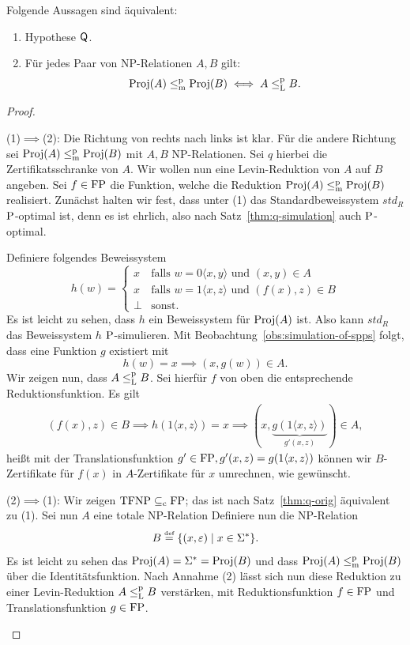 \begin{theorem}\label{thm:q-as-levin}
    Folgende Aussagen sind äquivalent:
    \begin{enumerate}
        \item Hypothese $\hQ$.
        \item Für jedes Paar von NP-Relationen $A, B$ gilt:
            \[ \Proj(A) \leqmp \Proj(B) \iff A \leqlp B. \]
    \end{enumerate}
\end{theorem}
\begin{proof}
    \begin{prooflist}
\item (1)$\implies$(2): Die Richtung von rechts nach links ist klar. Für die andere Richtung sei $\Proj(A) \leqmp \Proj(B)$ mit $A,B$ NP-Relationen. Sei $q$ hierbei die Zertifikatsschranke von $A$.
    Wir wollen nun eine Levin-Reduktion von $A$ auf $B$ angeben. Sei $f\in \FP$ die Funktion, welche die Reduktion $\Proj(A) \leqmp \Proj(B)$ realisiert.
    Zunächst halten wir fest, dass unter (1) das Standardbeweissystem $\mathit{std}_R$ $\P$-optimal ist, denn es ist ehrlich, also nach Satz~\ref{thm:q-simulation} auch $\P$-optimal.

    Definiere folgendes Beweissystem
    \[ h(w) = \begin{cases} x & \text{falls $w=0\langle x, y\rangle$ und $(x,y)\in A$} \\ x & \text{falls $w=1\langle x, z\rangle$ und $(f(x), z)\in B$} \\ \bot & \text{sonst}. \end{cases}\]
    Es ist leicht zu sehen, dass $h$ ein Beweissystem für $\Proj(A)$ ist.
    Also kann $\mathit{std}_R$ das Beweissystem $h$ $\P$-simulieren. Mit Beobachtung~\ref{obs:simulation-of-spps} folgt, dass eine Funktion $g$ existiert mit
    \[ h(w)=x\implies (x, g(w))\in A. \]
    Wir zeigen nun, dass $A\leqlp B$. Sei hierfür $f$ von oben die entsprechende Reduktionsfunktion.
    Es gilt
    \begin{gather*}
        (f(x), z)\in B \implies h(1\langle x, z\rangle)=x \implies (x, \underbrace{g(1\langle x, z\rangle)}_{g'(x, z)})\in A,
    \end{gather*}
    heißt mit der Translationsfunktion $g'\in\FP, g'(x,z)=g(1\langle x,z\rangle)$ können wir $B$-Zertifikate für $f(x)$ in $A$-Zertifikate für $x$ umrechnen, wie gewünscht.

\item (2)$\implies$(1): Wir zeigen $\TFNP\subseteqc \FP$; das ist nach Satz~\ref{thm:q-orig} äquivalent zu (1). Sei nun $A$ eine totale NP-Relation
    Definiere nun die NP-Relation
    \[ B \defeq \{ (x, \epsilon) \mid x\in\Sigma^* \}. \]
    Es ist leicht zu sehen das $\Proj(A)=\Sigma^*=\Proj(B)$ und dass $\Proj(A)\leqmp\Proj(B)$ über die Identitätsfunktion.
    Nach Annahme (2) lässt sich nun diese Reduktion zu einer Levin-Reduktion $A\leqlp B$ verstärken, mit Reduktionsfunktion $f\in\FP$ und  Translationsfunktion $g\in\FP$.


\end{prooflist}
\end{proof}
